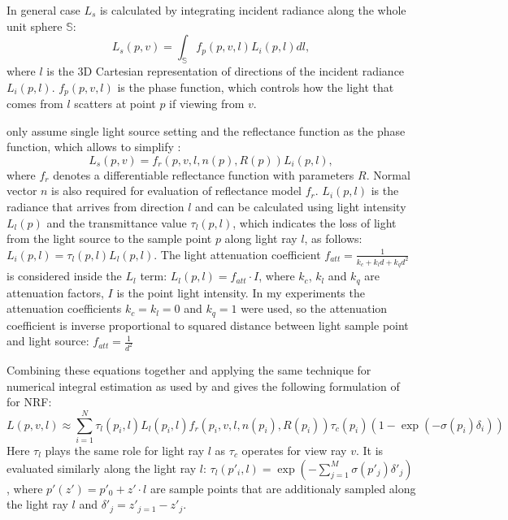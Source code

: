 In general case $L_s$ is calculated by integrating incident radiance along the whole unit sphere $\mathbb{S}$:
\begin{equation}
    \label{eq:radiance_Li}
    L_s(p, v) = \int_\mathbb{S} f_p(p, v, l) L_i(p, l)dl,
\end{equation}
where $l$ is the 3D Cartesian representation of directions of the incident radiance $L_i(p, l)$.
$f_p(p, v, l)$ is the phase function, which controls
how the light that comes from $l$ scatters at point $p$ if viewing from $v$.

\cite{bi2020neural} only assume single light source setting
and the reflectance function as the phase function,
which allows to simplify :
\begin{equation}
    L_s(p, v) = f_r(p, v, l, n(p), R(p)) L_i(p, l),
\end{equation}
where $f_r$ denotes a differentiable reflectance function
with parameters $R$.
Normal vector $n$ is also required for evaluation of reflectance model $f_r$.
$L_i(p, l)$ is the radiance that arrives from direction $l$ and can be calculated using light intensity $L_l(p)$
and the transmittance value $\tau_l(p, l)$,
which indicates the loss of light from the light source to the sample point $p$ along light ray $l$, as follows:
$L_i(p, l) = \tau_l(p, l) L_l(p, l)$.
The light attenuation coefficient $f_{att} = \frac{1}{k_c + k_l d + k_q d^2}$  is considered inside the $L_l$ term:
$L_l(p, l) = f_{att} \cdot I$,
where $k_c$, $k_l$ and $k_q$ are attenuation factors,
$I$ is the point light intensity.
In my experiments the attenuation coefficients $k_c = k_l = 0$ and $k_q = 1$ were used,
so the attenuation coefficient is inverse proportional to squared distance between light sample point and light source:
$f_{att} = \frac{1}{d^2}$

Combining these equations together and applying the same technique for numerical integral estimation
as used by \cite{mildenhall2020nerf} and \cite{liu2021neural} gives the following formulation of  for NRF:
\begin{equation}
    \label{eq:integral_estimation_nrf}
    L(p, v, l) \approx \sum_{i=1}^N \tau_l(p_i, l) L_l(p_i, l) f_r(p_i, v, l, n(p_i), R(p_i)) \tau_c(p_i) (1 - \exp (-\sigma(p_i)\delta_i))
\end{equation}
Here $\tau_l$ plays the same role for light ray $l$
as $\tau_c$ operates for view ray $v$.
It is evaluated similarly along the light ray $l$:
$\tau_l(p'_i, l) = \exp (-\sum_{j=1}^M \sigma(p'_j) \delta'_j)$,
where $p'(z') = p'_0 + z' \cdot l$ are sample points that are additionaly sampled along the light ray $l$ and $\delta'_j = z'_{j=1} - z'_j$.


